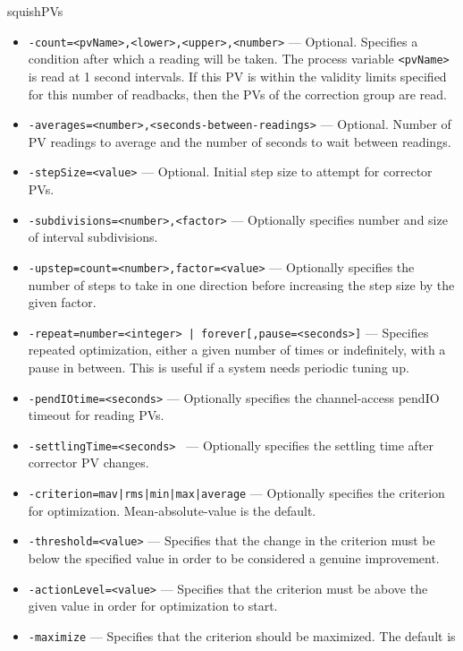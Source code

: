 \begin{sddsprog}{squishPVs}
    \begin{itemize}
      \item {\tt -count=<pvName>,<lower>,<upper>,<number>} --- Optional. Specifies
                a condition after which a reading will be taken. The process variable
                \verb+<pvName>+ is read at 1 second intervals. If this
                PV is within the validity limits specified for this number of readbacks, then
                the PVs of the correction group are read.                
        \item {\tt -averages=<number>,<seconds-between-readings>} --- Optional. Number of PV readings to average
                and the number of seconds to wait between readings.
        \item {\tt -stepSize=<value>} --- Optional. Initial step size to attempt for corrector PVs.
        \item {\tt -subdivisions=<number>,<factor>} --- Optionally specifies number and size of interval
                     subdivisions.
        \item {\tt -upstep=count=<number>,factor=<value>} --- Optionally specifies the number of steps
                to take in one direction before increasing the step size by the given factor.
        \item {\tt -repeat={number=<integer> | forever}[,pause=<seconds>]} --- Specifies repeated
                optimization, either a given number of times or indefinitely, with a pause in between.
                This is useful if a system needs periodic tuning up.
        \item {\tt -pendIOtime=<seconds>} --- Optionally specifies the channel-access pendIO timeout for reading PVs.
        \item {\tt -settlingTime=<seconds> } --- Optionally specifies the settling time after corrector PV changes.
        \item {\tt -criterion={mav|rms|min|max|average}} --- Optionally specifies the criterion for optimization.
                Mean-absolute-value is the default.
        \item {\tt -threshold=<value>} --- Specifies that the change in the criterion must be below the specified
        value in order to be considered a genuine improvement.
        \item {\tt -actionLevel=<value>} --- Specifies that the criterion must be above the given value
        in order for optimization to start.
        \item {\tt -maximize} --- Specifies that the criterion should be maximized.  The default is

\end{itemize}
\end{sddsprog}
